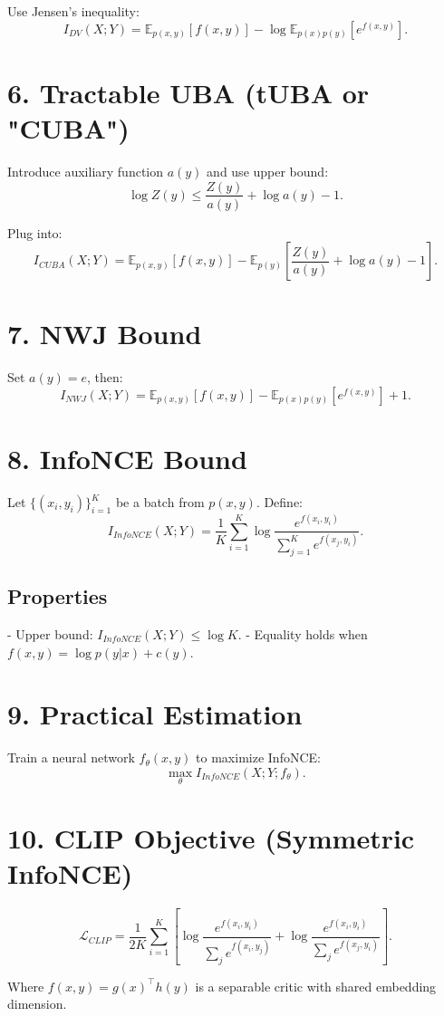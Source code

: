 \documentclass{article}
\begin{document}
Use Jensen’s inequality:
\[
I_{DV}(X;Y) = \mathbb{E}_{p(x,y)}[f(x,y)] - \log \mathbb{E}_{p(x)p(y)}[e^{f(x,y)}].
\]

\section*{6. Tractable UBA (tUBA or "CUBA")}

Introduce auxiliary function $a(y)$ and use upper bound:
\[
\log Z(y) \leq \frac{Z(y)}{a(y)} + \log a(y) - 1.
\]

Plug into:
\[
I_{CUBA}(X;Y) = \mathbb{E}_{p(x,y)}[f(x,y)] - \mathbb{E}_{p(y)} \left[ \frac{Z(y)}{a(y)} + \log a(y) - 1 \right].
\]

\section*{7. NWJ Bound}

Set $a(y) = e$, then:
\[
I_{NWJ}(X;Y) = \mathbb{E}_{p(x,y)}[f(x,y)] - \mathbb{E}_{p(x)p(y)}[e^{f(x,y)}] + 1.
\]

\section*{8. InfoNCE Bound}

Let $\{(x_i, y_i)\}_{i=1}^K$ be a batch from $p(x,y)$. Define:
\[
I_{InfoNCE}(X;Y) = \frac{1}{K} \sum_{i=1}^K \log \frac{e^{f(x_i, y_i)}}{\sum_{j=1}^K e^{f(x_j, y_i)}}.
\]

\subsection*{Properties}
- Upper bound: $I_{InfoNCE}(X;Y) \leq \log K$.
- Equality holds when $f(x,y) = \log p(y|x) + c(y)$.

\section*{9. Practical Estimation}

Train a neural network $f_\theta(x,y)$ to maximize InfoNCE:
\[
\max_\theta I_{InfoNCE}(X;Y; f_\theta).
\]

\section*{10. CLIP Objective (Symmetric InfoNCE)}

\[
\mathcal{L}_{CLIP} = \frac{1}{2K} \sum_{i=1}^K \left[ 
\log \frac{e^{f(x_i, y_i)}}{\sum_j e^{f(x_i, y_j)}} +
\log \frac{e^{f(x_i, y_i)}}{\sum_j e^{f(x_j, y_i)}}
\right].
\]

Where $f(x, y) = g(x)^\top h(y)$ is a separable critic with shared embedding dimension.
\end{document}
